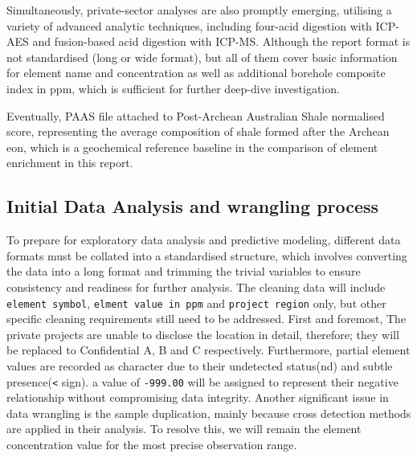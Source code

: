 \documentclass[11pt,a4paper,]{article}
\begin{document}
Simultaneously, private-sector analyses are also promptly emerging, utilising a variety of advanced analytic techniques, including four-acid digestion with ICP-AES and fusion-based acid digestion with ICP-MS. Although the report format is not standardised (long or wide format), but all of them cover basic information for element name and concentration as well as additional borehole composite index in ppm, which is sufficient for further deep-dive investigation.

Eventually, PAAS file attached to \autocite{McLennan2011} Post-Archean Australian Shale normalised score, representing the average composition of shale formed after the Archean eon, which is a geochemical reference baseline in the comparison of element enrichment in this report.

\subsection{Initial Data Analysis and wrangling process}\label{initial-data-analysis-and-wrangling-process}

To prepare for exploratory data analysis and predictive modeling, different data formats must be collated into a standardised structure, which involves converting the data into a long format and trimming the trivial variables to ensure consistency and readiness for further analysis. The cleaning data will include \texttt{element\ symbol}, \texttt{elment\ value\ in\ ppm} and \texttt{project\ region} only, but other specific cleaning requirements still need to be addressed. First and foremost, The private projects are unable to disclose the location in detail, therefore; they will be replaced to Confidential A, B and C respectively. Furthermore, partial element values are recorded as character due to their undetected status(nd) and subtle presence(\texttt{\textless{}} sign). a value of \texttt{-999.00} will be assigned to represent their negative relationship without compromising data integrity. Another significant issue in data wrangling is the sample duplication, mainly because cross detection methods are applied in their analysis. To resolve this, we will remain the element concentration value for the most precise observation range.
\end{document}
